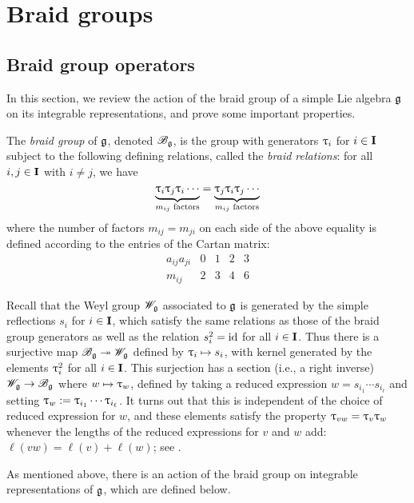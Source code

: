 \chapter{Braid groups}

\section{Braid group operators}

In this section, we review the action of the braid group of a simple Lie algebra $\mathfrak{g}$ on its integrable representations, and prove some important properties.

The \emph{braid group} of $\mathfrak{g}$, denoted $\mathscr{B}_{\mathfrak{g}}$, is the group with generators $\uptau_i$ for $i\in\mathbf{I}$ subject to the following defining relations, called the \emph{braid relations}: for all $i,j\in\mathbf{I}$ with $i\neq j$, we have
\[\underbrace{\uptau_i\uptau_j\uptau_i\cdots}_{m_{ij}\text{ factors}} = \underbrace{\uptau_j\uptau_i\uptau_j\cdots}_{m_{ij}\text{ factors}}\]
where the number of factors $m_{ij}=m_{ji}$ on each side of the above equality is defined according to the entries of the Cartan matrix:
\[\begin{array}{c|cccc}
    a_{ij}a_{ji} & 0 & 1 & 2 & 3 \\
    \hline
    m_{ij} & 2 & 3 & 4 & 6
\end{array}\]

Recall that the Weyl group $\mathscr{W}_{\mathfrak{g}}$ associated to $\mathfrak{g}$ is generated by the simple reflections $s_i$ for $i\in\mathbf{I}$, which satisfy the same relations as those of the braid group generators as well as the relation $s_i^2={\operatorname{id}}$ for all $i\in\mathbf{I}$.
Thus there is a surjective map $\mathscr{B}_{\mathfrak{g}}\twoheadrightarrow\mathscr{W}_{\mathfrak{g}}$ defined by $\uptau_i\mapsto s_i$, with kernel generated by the elements $\uptau_i^2$ for all $i\in\mathbf{I}$.
This surjection has a section (i.e., a right inverse) $\mathscr{W}_{\mathfrak{g}}\to\mathscr{B}_{\mathfrak{g}}$ where $w\mapsto\uptau_w$, defined by taking a reduced expression $w=s_{i_1}\cdots s_{i_\ell}$ and setting $\uptau_w:=\uptau_{i_1}\cdots\uptau_{i_\ell}$.
It turns out that this is independent of the choice of reduced expression for $w$, and these elements satisfy the property $\uptau_{vw}=\uptau_v\uptau_w$ whenever the lengths of the reduced expressions for $v$ and $w$ add: $\ell(vw)=\ell(v)+\ell(w)$; see \cite[\S2.1.2]{lusztig_introduction_2010}.

As mentioned above, there is an action of the braid group on integrable representations of $\mathfrak{g}$, which are defined below.

